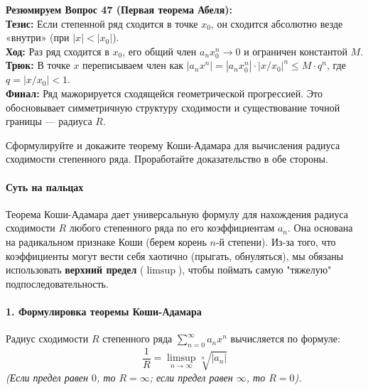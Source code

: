 \begin{tcolorbox}[colback=gray!5, colframe=black, boxrule=0.5pt, arc=0pt]
\textbf{Резюмируем Вопрос 47 (Первая теорема Абеля):} \\
\textbf{Тезис:} Если степенной ряд сходится в точке $x_0$, он сходится абсолютно везде «внутри» (при $|x| < |x_0|$). \\
\textbf{Ход:} Раз ряд сходится в $x_0$, его общий член $a_n x_0^n \to 0$ и ограничен константой $M$. \\
\textbf{Трюк:} В точке $x$ переписываем член как $|a_n x^n| = |a_n x_0^n| \cdot |x/x_0|^n \le M \cdot q^n$, где $q = |x/x_0| < 1$. \\
\textbf{Финал:} Ряд мажорируется сходящейся геометрической прогрессией. Это обосновывает симметричную структуру сходимости и существование точной границы — радиуса $R$.
\end{tcolorbox}




{Сформулируйте и докажите теорему Коши-Адамара для вычисления радиуса сходимости степенного ряда. Проработайте доказательство в обе стороны.}

\paragraph{Суть на пальцах}
Теорема Коши-Адамара дает универсальную формулу для нахождения радиуса сходимости $R$ любого степенного ряда по его коэффициентам $a_n$. Она основана на радикальном признаке Коши (берем корень $n$-й степени). Из-за того, что коэффициенты могут вести себя хаотично (прыгать, обнуляться), мы обязаны использовать \textbf{верхний предел} ($\limsup$), чтобы поймать самую "тяжелую" подпоследовательность.

\paragraph{1. Формулировка теоремы Коши-Адамара}
Радиус сходимости $R$ степенного ряда $\sum_{n=0}^{\infty} a_n x^n$ вычисляется по формуле:
$$ \frac{1}{R} = \limsup_{n \to \infty} \sqrt[n]{|a_n|} $$
\textit{(Если предел равен $0$, то $R = \infty$; если предел равен $\infty$, то $R = 0$).}

